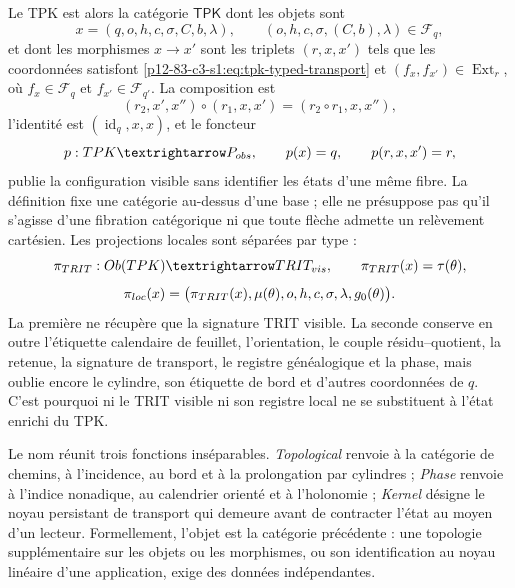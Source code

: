 Le TPK est alors la catégorie \(\mathsf{TPK}\) dont les objets sont
\begin{equation}
x=(q,o,h,c,\sigma,C,b,\lambda),
\qquad (o,h,c,\sigma,(C,b),\lambda)\in\mathcal F_q,
\label{p12-83-c3-s1:eq:tpk-enriched-object}
\end{equation}
et dont les morphismes \(x\to x'\) sont les triplets \((r,x,x')\) tels que
les coordonnées satisfont \eqref{p12-83-c3-s1:eq:tpk-typed-transport} et
\((f_x,f_{x'})\in\operatorname{Ext}_r\), où
\(f_x\in\mathcal F_q\) et \(f_{x'}\in\mathcal F_{q'}\). La composition est
\begin{equation}
(r_2,x',x'')\circ(r_1,x,x')
=(r_2\circ r_1,x,x''),
\label{p12-83-c3-s1:eq:tpk-morphism-composition}
\end{equation}
l'identité est \((\operatorname{id}_q,x,x)\), et le foncteur
\begin{equation}
p:\mathsf{TPK}\longrightarrow\mathsf P_{\rm obs},
\qquad p(x)=q,
\qquad p(r,x,x')=r,
\label{p12-83-c3-s1:eq:tpk-base-functor}
\end{equation}
publie la configuration visible sans identifier les états d'une même fibre.
La définition fixe une catégorie au-dessus d'une base ; elle ne présuppose pas qu'il s'agisse d'une
fibration catégorique ni que toute flèche admette un relèvement cartésien.
Les projections locales sont séparées par type :
\[
\pi_{\rm TRIT}:\operatorname{Ob}(\mathsf{TPK})
\longrightarrow\mathrm{TRIT}_{\rm vis},
\qquad
\pi_{\rm TRIT}(x)=\tau(\theta),
\]
\[
\pi_{\rm loc}(x)=
\bigl(\pi_{\rm TRIT}(x),\mu(\theta),o,h,c,
\sigma,\lambda,g_0(\theta)\bigr).
\]
La première ne récupère que la signature TRIT visible. La seconde conserve
en outre l'étiquette calendaire de feuillet, l'orientation, le couple
résidu--quotient, la retenue, la signature de transport, le registre généalogique et la phase,
mais oublie encore le cylindre, son étiquette de bord et d'autres coordonnées de
\(q\). C'est pourquoi ni le TRIT visible ni son registre local
ne se substituent à l'état enrichi du TPK.

Le nom réunit trois fonctions inséparables. \emph{Topological} renvoie à
la catégorie de chemins, à l'incidence, au bord et à la prolongation par
cylindres ; \emph{Phase} renvoie à l'indice nonadique, au calendrier orienté et
à l'holonomie ; \emph{Kernel} désigne le noyau persistant de transport qui
demeure avant de contracter l'état au moyen d'un lecteur. Formellement,
l'objet est la catégorie précédente : une topologie supplémentaire sur les objets ou
les morphismes, ou son identification au noyau linéaire d'une application, exige
des données indépendantes.

